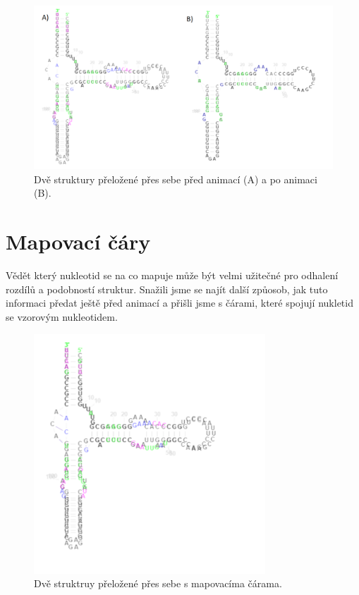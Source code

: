 \begin{figure}[H]
  \centering
  \includegraphics[width=140mm]{../img/kap02/animation.png}
  \caption{Dvě struktury přeložené přes sebe před animací (A) a po animaci (B).}
\end{figure}

\section{Mapovací čáry}

Vědět který nukleotid se na co mapuje může být velmi užitečné pro odhalení
rozdílů a podobností struktur. Snažili jsme se najít další způosob, jak tuto
informaci předat ještě před animací a přišli jsme s čárami, které spojují
nukletid se vzorovým nukleotidem.

\begin{figure}[H]
  \centering
  \includegraphics[height=90mm]{../img/kap02/mappingLines/small.png}
  \caption{Dvě struktruy přeložené přes sebe s mapovacíma čárama.}
\end{figure}

